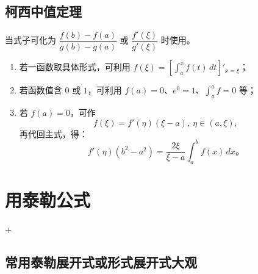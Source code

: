 \subsection{柯西中值定理}
当式子可化为 $\dfrac{f(b)-f(a)}{g(b)-g(a)}$ 或 $\dfrac{f'(\xi)}{g'(\xi)}$ 时使用。
\begin{enumerate}
    \item 若一函数取具体形式，可利用 $\displaystyle f(\xi)=\left[\int_a^x f(t)\,dt\right]'_{x=\xi}$；
    \item 若函数值含 $0$ 或 $1$，可利用 $f(a)=0$、$e^0=1$、$\int_a^a f=0$ 等；
    \item 若 $f(a)=0$，可作
          \[
              f(\xi)=f'(\eta)(\xi-a),\ \eta\in(a,\xi),
          \]
          再代回主式，得：
          \[
              f'(\eta)(b^2-a^2)=\frac{2\xi}{\xi-a}\int_a^b f(x)\,dx。
          \]
\end{enumerate}


\section{用泰勒公式}
\DTwoThree+\DThree

\subsection{常用泰勒展开式或形式展开式大观}

